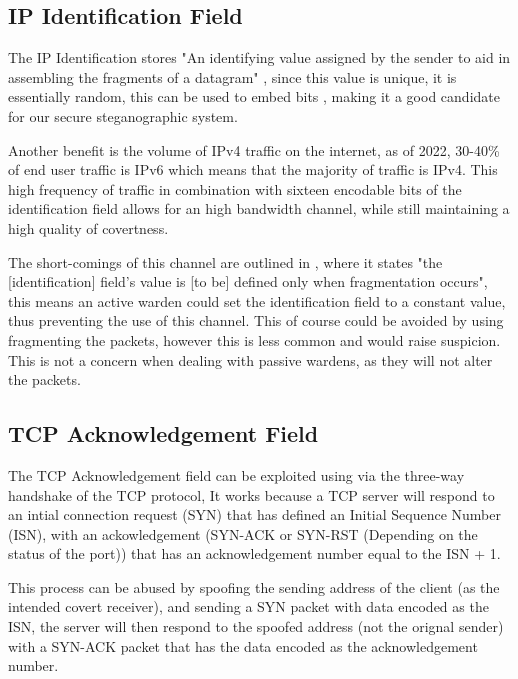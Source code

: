 \subsection{IP Identification Field}

The IP Identification stores "An identifying value assigned by the sender to aid in assembling the fragments of a datagram" \cite{rfc791}, since this value is unique, it is essentially random, this can be used to embed bits \cite{EoIICCA}, making it a good candidate for our secure steganographic system.

Another benefit is the volume of IPv4 traffic on the internet, as of 2022, 30-40\% of end user traffic is IPv6 \cite{I10YO} which means that the majority of traffic is IPv4. This high frequency of traffic in combination with sixteen encodable bits of the identification field allows for an high bandwidth channel, while still maintaining a high quality of covertness.

The short-comings of this channel are outlined in \cite{rfc6864}, where it states "the [identification] field's value is [to be] defined only when fragmentation occurs", this means an active warden could set the identification field to a constant value, thus preventing the use of this channel. This of course could be avoided by using fragmenting the packets, however this is less common and would raise suspicion. This is not a concern when dealing with passive wardens, as they will not alter the packets.

\subsection{TCP Acknowledgement Field}

The TCP Acknowledgement field can be exploited using via the three-way handshake of the TCP protocol, It works because a TCP server will respond to an intial connection request (SYN) that has defined an Initial Sequence Number (ISN), with an ackowledgement (SYN-ACK or SYN-RST (Depending on the status of the port)) that has an acknowledgement number equal to the ISN + 1.

This process can be abused by spoofing the sending address of the client (as the intended covert receiver), and sending a SYN packet with data encoded as the ISN, the server will then respond to the spoofed address (not the orignal sender) with a SYN-ACK packet that has the data encoded as the acknowledgement number. \cite{CCitTCPIPPS}

